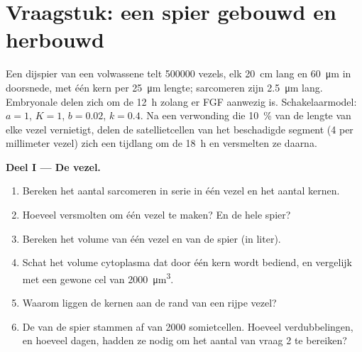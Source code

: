 \section{Vraagstuk: een spier gebouwd en herbouwd}

\begin{problem}
\label{pb:b2:cell-differentiation:1}
Een dijspier van een volwassene telt \num{500000} vezels, elk
\qty{20}{cm} lang en \qty{60}{\micro m} in doorsnede, met één kern per
\qty{25}{\micro m} lengte; sarcomeren zijn \qty{2.5}{\micro m} lang.
Embryonale  delen zich om de \qty{12}{h} zolang er FGF aanwezig
is. Schakelaarmodel: $a = 1$, $K = 1$, $b = 0.02$, $k
= 0.4$. Na een verwonding die \qty{10}{\%} van de lengte van elke vezel
vernietigt, delen de satellietcellen van het beschadigde segment (\num{4}
per millimeter vezel) zich een tijdlang om de \qty{18}{h} en versmelten ze
daarna.

\medskip
\noindent\textbf{Deel I --- De vezel.}
\begin{enumerate}
  \item Bereken het aantal sarcomeren in serie in één vezel en het aantal
        kernen.
  \item Hoeveel  versmolten om één vezel te maken? En de hele
        spier?
  \item Bereken het volume van één vezel en van de spier (in liter).
  \item Schat het volume cytoplasma dat door één kern wordt bediend, en
        vergelijk met een gewone cel van \qty{2000}{\micro m^3}.
  \item Waarom liggen de kernen aan de rand van een rijpe vezel?
  \item De  van de spier stammen af van \num{2000} somietcellen.
        Hoeveel verdubbelingen, en hoeveel dagen, hadden ze nodig om het
        aantal van vraag 2 te bereiken?
\end{enumerate}


\end{problem}
